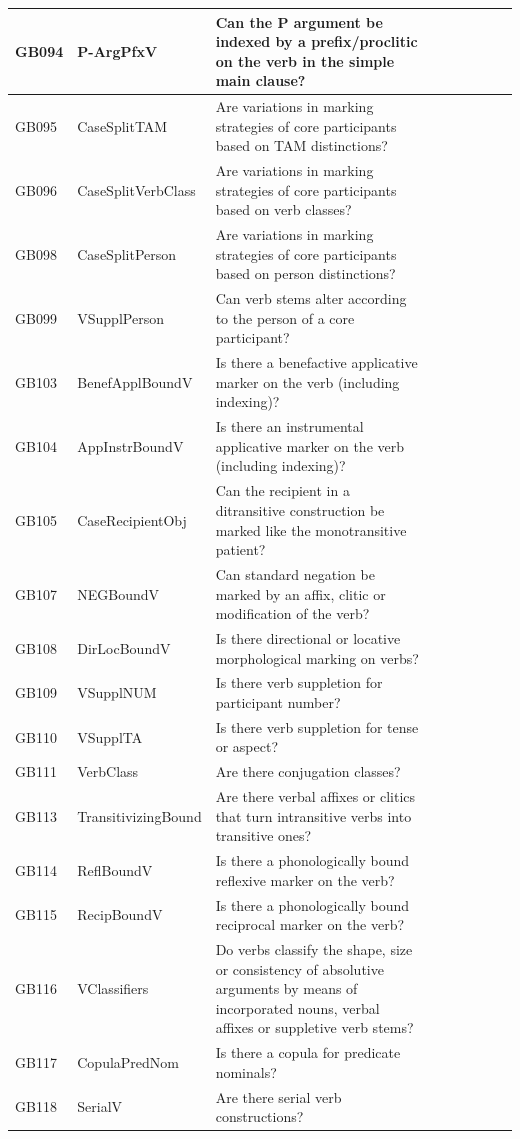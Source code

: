 \documentclass[draft,10pt]{article} %
\begin{document}
\begin{landscape}
\begin{longtable}{| l | p{4cm}| p{12cm}|p{2cm}|p{2cm}|p{2cm}|p{2cm}|p{2cm}|p{2cm}|}
GB094 & P-ArgPfxV&Can the P argument be indexed by a prefix/proclitic on the verb in the simple main clause?\\ \hline
GB095 & CaseSplitTAM&Are variations in marking strategies of core participants based on TAM distinctions?\\ \hline
GB096 & CaseSplitVerbClass&Are variations in marking strategies of core participants based on verb classes?\\ \hline
GB098 & CaseSplitPerson&Are variations in marking strategies of core participants based on person distinctions?\\ \hline
GB099 & VSupplPerson&Can verb stems alter according to the person of a core participant?\\ \hline
GB103 & BenefApplBoundV&Is there a benefactive applicative marker on the verb (including indexing)?\\ \hline
GB104 & AppInstrBoundV&Is there an instrumental applicative marker on the verb (including indexing)?\\ \hline
GB105 & CaseRecipientObj&Can the recipient in a ditransitive construction be marked like the monotransitive patient?\\ \hline
GB107 & NEGBoundV&Can standard negation be marked by an affix, clitic or modification of the verb?\\ \hline
GB108 & DirLocBoundV&Is there directional or locative morphological marking on verbs?\\ \hline
GB109 & VSupplNUM&Is there verb suppletion for participant number?\\ \hline
GB110 & VSupplTA&Is there verb suppletion for tense or aspect?\\ \hline
GB111 & VerbClass&Are there conjugation classes?\\ \hline
GB113 & TransitivizingBound&Are there verbal affixes or clitics that turn intransitive verbs into transitive ones?\\ \hline
GB114 & ReflBoundV&Is there a phonologically bound reflexive marker on the verb?\\ \hline
GB115 & RecipBoundV&Is there a phonologically bound reciprocal marker on the verb?\\ \hline
GB116 & VClassifiers&Do verbs classify the shape, size or consistency of absolutive arguments by means of incorporated nouns, verbal affixes or suppletive verb stems?\\ \hline
GB117 & CopulaPredNom&Is there a copula for predicate nominals?\\ \hline
GB118 & SerialV&Are there serial verb constructions?\\ \hline

\end{longtable}
\end{landscape}
\end{document}
